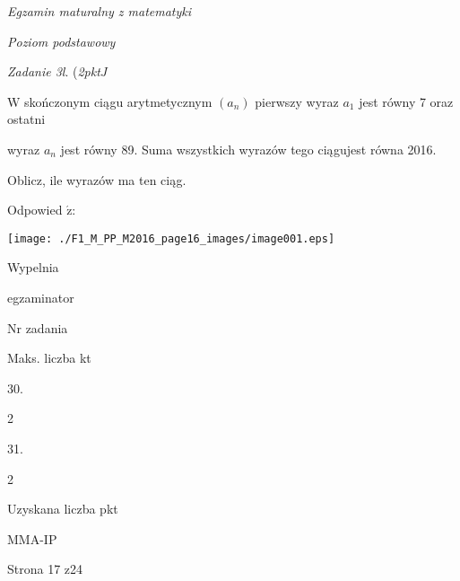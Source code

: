 \documentclass[a4paper,12pt]{article}
\begin{document}
{\it Egzamin maturalny z matematyki}

{\it Poziom podstawowy}

{\it Zadanie 3l}. ({\it 2pktJ}

$\mathrm{W}$ skończonym ciągu arytmetycznym $(a_{n})$ pierwszy wyraz $a_{1}$ jest równy 7 oraz ostatni

wyraz $a_{n}$ jest równy 89. Suma wszystkich wyrazów tego ciągujest równa 2016.

Oblicz, ile wyrazów ma ten ciąg.

Odpowied $\acute{\mathrm{z}}$:
\begin{center}
\texttt{[image: ./F1\_M\_PP\_M2016\_page16\_images/image001.eps]}
\end{center}
Wypelnia

egzaminator

Nr zadania

Maks. liczba kt

30.

2

31.

2

Uzyskana liczba pkt

MMA-IP

Strona 17 z24
\end{document}
